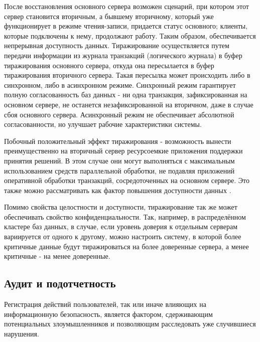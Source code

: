 После восстановления основного сервера возможен сценарий, при котором этот сервер становится
вторичным, а бывшему вторичному, который уже функционирует в режиме чтения-записи, придается
статус основного; клиенты, которые подключены к нему, продолжают работу. Таким образом,
обеспечивается непрерывная доступность данных.
Тиражирование осуществляется путем передачи информации из журнала транзакций (логического журнала)
в буфер тиражирования основного сервера, откуда она пересылается в буфер тиражирования вторичного
сервера. Такая пересылка может происходить либо в синхронном, либо в асинхронном режиме. Синхронный
режим гарантирует полную согласованность баз данных - ни одна транзакция, зафиксированная на
основном сервере, не останется незафиксированной на вторичном, даже в случае сбоя основного
сервера. Асинхронный режим не обеспечивает абсолютной согласованности, но улучшает рабочие
характеристики системы.

Побочный положительный эффект тиражирования - возможность вынести преимущественно на вторичный
сервер ресурсоемкие приложения поддержки принятия решений. В этом случае они могут выполняться с
максимальным использованием средств параллельной обработки, не подавляя приложений оперативной
обработки транзакций, сосредоточенных на основном сервере. Это также можно рассматривать как фактор
повышения доступности данных \cite{data-replication}.

Помимо свойства целостности и доступности, тиражирование так же может обеспечивать свойство
конфиденциальности. Так, например, в распределённом кластере баз данных, в случае, если уровень
доверия к отдельным серверам вариируется от одного к другому, можно настроить систему, в
которой более критичные данные будут тиражироваться на более доверенные сервера, а менее
критичные - на менее доверенные.


\subsection{Аудит и подотчетность}
Регистрация действий пользователей, так или иначе влияющих на информационную безопасность, является
фактором, сдерживающим потенциальных злоумышленников и позволяющим расследовать уже случившиеся нарушения.

